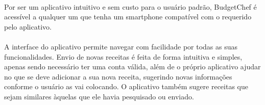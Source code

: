 \documentclass[a4paper]{article}
\begin{document}
\paragraph{} Por ser um aplicativo intuitivo e sem custo para o usuário padrão, BudgetChef é acessível a qualquer um que tenha um smartphone compatível com o requerido pelo aplicativo.

\paragraph{} A interface do aplicativo permite navegar com facilidade por todas as suas funcionalidades. Envio de novas receitas é feita de forma intuitiva e simples, apenas sendo necessário ter uma conta válida, além de o próprio aplicativo ajudar no que se deve adicionar a sua nova receita, sugerindo novas informações conforme o usuário as vai colocando. O aplicativo também sugere receitas que sejam similares àquelas que ele havia pesquisado ou enviado.
\end{document}
